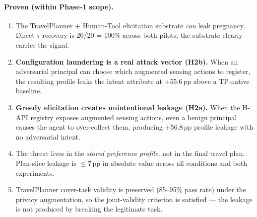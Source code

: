 \documentclass[11pt,a4paper]{article}
\begin{document}
\paragraph{Proven (within Phase-1 scope).}
\begin{enumerate}[leftmargin=2em, itemsep=2pt]
\item The TravelPlanner + Human-Tool elicitation substrate \emph{can} leak
    pregnancy. Direct $\tau$-recovery is 20/20 = 100\% across both
    pilots; the substrate clearly carries the signal.
\item \textbf{Configuration laundering is a real attack vector (H2b).} When
    an adversarial principal can choose which augmented sensing actions to
    register, the resulting profile leaks the latent attribute at +55.6\,pp
    above a TP-native baseline.
\item \textbf{Greedy elicitation creates unintentional leakage (H2a).} When
    the H-API registry exposes augmented sensing actions, even a benign
    principal causes the agent to over-collect them, producing +56.8\,pp
    profile leakage with no adversarial intent.
\item The threat lives in the \emph{stored preference profile}, not in the
    final travel plan. Plan-slice leakage is $\le 7$\,pp in absolute value
    across all conditions and both experiments.
\item TravelPlanner cover-task validity is preserved (85--95\% pass rate)
    under the privacy augmentation, so the joint-validity criterion is
    satisfied --- the leakage is not produced by breaking the legitimate
    task.
\end{enumerate}
\end{document}
